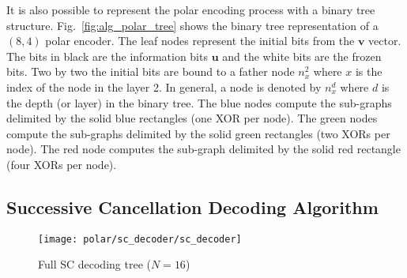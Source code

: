 It is also possible to represent the polar encoding process with a binary tree
structure. Fig.~\ref{fig:alg_polar_tree} shows the binary tree representation of
a $(8,4)$ polar encoder. The leaf nodes represent the initial bits from the
$\bm{v}$ vector. The bits in black are the information bits $\bm{u}$ and the
white bits are the frozen bits. Two by two the initial bits are bound to a
father node $n_x^2$ where $x$ is the index of the node in the layer 2. In
general, a node is denoted by $n_x^d$ where $d$ is the depth (or layer) in the
binary tree. The {\color{Paired-1} blue} nodes compute the sub-graphs delimited
by the solid {\color{Paired-1} blue} rectangles (one XOR per node). The
{\color{Paired-3} green} nodes compute the sub-graphs delimited by the solid
{\color{Paired-3} green} rectangles (two XORs per node). The {\color{Paired-5}
red} node computes the sub-graph delimited by the solid {\color{Paired-5} red}
rectangle (four XORs per node).

\subsection{Successive Cancellation Decoding Algorithm}

\begin{figure}[htp]
  \centering
  \texttt{[image: polar/sc\_decoder/sc\_decoder]}
  \caption{Full SC decoding tree ($N = 16$)}
  \label{fig:alg_polar_sc_decoder}
\end{figure}

